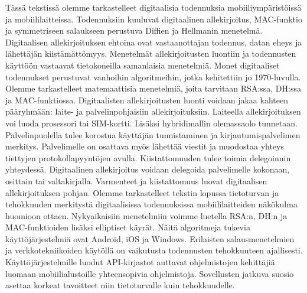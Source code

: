 \documentclass[finnish]{tktltiki2}
\theoremstyle{definition}
\theoremstyle{remark}
\begin{document}
Tässä tekstissä olemme tarkastelleet digitaalisia todennuksia mobiiliympäristöissä ja mobiililaitteissa. Todennuksiin kuuluvat digitaalinen allekirjoitus, MAC-funktio ja symmetriseen salaukseen perustuva Diffien ja Hellmanin menetelmä. Digitaalisen allekirjoituksen ehtoina ovat vastaanottajan todennus, datan eheys ja lähettäjän kiistämättömyys. Menetelmät allekirjoitusten luontiin ja todennusten käyttöön vastaavat tietokoneilla samanlaisia menetelmiä. Monet digitaaliset todennukset perustuvat vanhoihin algoritmeihin, jotka kehitettiin jo 1970-luvulla. Olemme tarkastelleet matemaattisia menetelmiä, joita tarvitaan RSA:ssa, DH:ssa ja MAC-funktiossa. Digitaalisten allekirjoitusten luonti voidaan jakaa kahteen pääryhmään: laite- ja palvelinpohjaisiin allekirjoituksiin. Laiteella allekirjoituksen voi luoda prosessori tai SIM-kortti. Lisäksi hybridimallin olemassaolo tunnetaan. Palvelinpuolella tulee korostua käyttäjän tunnistaminen ja kirjautumispalvelimen merkitys. Palvelimelle on osattava myös lähettää viestit ja muodostaa yhteys tiettyjen protokollapyyntöjen avulla. Kiistattomuuden tulee toimia delegoinnin yhteydessä. Digitaalinen allekirjoitus voidaan delegoida palvelimelle kokonaan, osittain tai valtakirjalla. Varmenteet ja kiistattomuus luovat digitaalisen allekirjoituksen pohjan. Olemme tarkastelleet tekstin lopussa tietoturvan ja tehokkuuden merkitystä digitaalisissa todennuksissa mobiililaitteiden näkökulma huomioon ottaen. Nykyaikaisiin menetelmiin voimme luetella RSA:n, DH:n ja MAC-funktioiden lisäksi elliptiset käyrät. Näitä algoritmeja tukevia käyttöjärjestelmiä ovat Android, iOS ja Windows. Erilaisten salausmenetelmien ja verkkotekniikoiden käytöllä on vaikutusta todennusten tehokkuuteen ajallisesti. Käyttöjärjestelmille luodut API-kirjastot auttavat ohjelmistojen kehittäjiä luomaan mobiilialustoille yhteensopivia ohjelmistoja. Sovellusten jatkuva suosio asettaa korkeat tavoitteet niin tietoturvalle kuin tehokkuudelle.

%
%
%

\newpage






 
\end{document}
